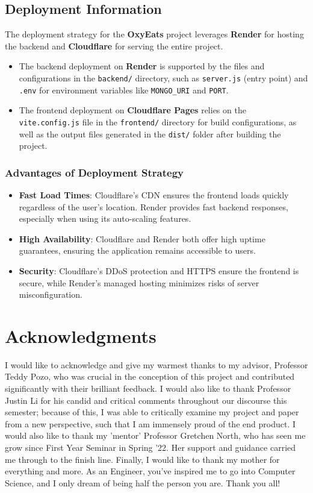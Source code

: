\documentclass[10pt,twocolumn]{article}
\begin{document}
\subsection{Deployment Information}

The deployment strategy for the \textbf{OxyEats} project leverages \textbf{Render} for hosting the backend and \textbf{Cloudflare} for serving the entire project. 
\begin{itemize}
    \item The backend deployment on \textbf{Render} is supported by the files and configurations in the \texttt{backend/} directory, such as \texttt{server.js} (entry point) and \texttt{.env} for environment variables like \texttt{MONGO\_URI} and \texttt{PORT}.
    \item The frontend deployment on \textbf{Cloudflare Pages} relies on the \texttt{vite.config.js} file in the \texttt{frontend/} directory for build configurations, as well as the output files generated in the \texttt{dist/} folder after building the project.
\end{itemize}

\subsubsection{Advantages of Deployment Strategy}

\begin{itemize}
    \item \textbf{Fast Load Times}: Cloudflare's CDN ensures the frontend loads quickly regardless of the user's location. Render provides fast backend responses, especially when using its auto-scaling features.
    \item \textbf{High Availability}: Cloudflare and Render both offer high uptime guarantees, ensuring the application remains accessible to users.
    \item \textbf{Security}: Cloudflare's DDoS protection and HTTPS ensure the frontend is secure, while Render's managed hosting minimizes risks of server misconfiguration.
\end{itemize}

\section{Acknowledgments}
I would like to acknowledge and give my warmest thanks to my advisor, Professor Teddy Pozo, who was crucial in the conception of this project and contributed significantly with their brilliant feedback. I would also like to thank Professor Justin Li for his candid and critical comments throughout our discourse this semester; because of this, I was able to critically examine my project and paper from a new perspective, such that I am immensely proud of the end product. I would also like to thank my 'mentor' Professor Gretchen North, who has seen me grow since First Year Seminar in Spring '22. Her support and guidance carried me through to the finish line. Finally, I would like to thank my mother for everything and more. As an Engineer, you've inspired me to go into Computer Science, and I only dream of being half the person you are. Thank you all!

\printbibliography
\end{document}

